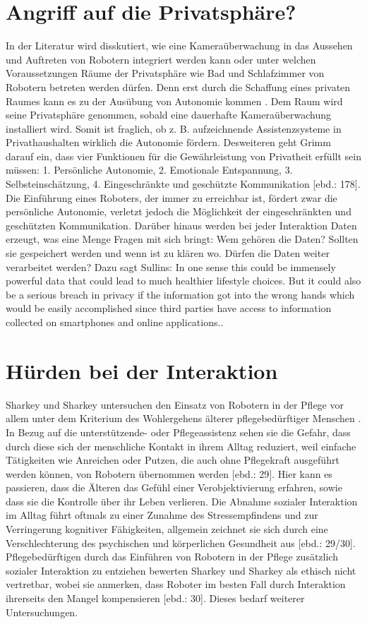 \section{Angriff auf die Privatsphäre?}
\label{sec:priv}
In der Literatur wird disskutiert, wie eine Kameraüberwachung in das Aussehen und Auftreten von Robotern integriert werden kann oder unter welchen Voraussetzungen Räume der Privatsphäre wie Bad und Schlafzimmer von Robotern betreten werden dürfen. Denn erst durch die Schaffung eines privaten Raumes kann es zu der Ausübung von Autonomie kommen \cite[178]{priv}. Dem Raum wird seine Privatsphäre genommen, sobald eine dauerhafte Kameraüberwachung installiert wird. Somit ist fraglich, ob z. B. aufzeichnende Assistenzsysteme in Privathaushalten wirklich die Autonomie fördern. Desweiteren geht Grimm darauf ein, dass vier Funktionen für die Gewährleistung von Privatheit erfüllt sein müssen: 1. Persönliche Autonomie, 2. Emotionale Entspannung, 3. Selbsteinschätzung, 4. Eingeschränkte und geschützte Kommunikation [ebd.: 178]. Die Einführung eines Roboters, der immer zu erreichbar ist, fördert zwar die persönliche Autonomie, verletzt jedoch die Möglichkeit der eingeschränkten und geschützten Kommunikation.
Darüber hinaus werden bei jeder Interaktion Daten erzeugt, was eine Menge Fragen mit sich bringt: Wem gehören die Daten? Sollten sie gespeichert werden und wenn ist zu klären wo. Dürfen die Daten weiter verarbeitet werden? Dazu sagt Sullins: \grqq In one sense this could be immensely powerful data that could lead to much healthier lifestyle choices. But it could also be a serious breach in privacy if the information got into the wrong hands which would be easily accomplished since third parties have access to information collected on smartphones and online applications.\grqq \cite{sullins}.
\section{Hürden bei der Interaktion}
\label{sec.interaction}
Sharkey und Sharkey untersuchen den Einsatz von Robotern in der Pflege vor allem unter dem Kriterium des Wohlergehens älterer pflegebedürftiger Menschen \cite[28]{sharky}. In Bezug auf die unterstützende- oder Pflegeassistenz sehen sie die Gefahr, dass durch diese sich der menschliche Kontakt in ihrem Alltag reduziert, weil einfache Tätigkeiten wie Anreichen oder Putzen, die auch ohne Pflegekraft ausgeführt werden können, von Robotern übernommen werden [ebd.: 29]. Hier kann es passieren, dass die Älteren das Gefühl einer Verobjektivierung erfahren, sowie dass sie die Kontrolle über ihr Leben verlieren. Die Abnahme sozialer Interaktion im Alltag führt oftmals zu einer Zunahme des Stressempfindens und zur Verringerung kognitiver Fähigkeiten, allgemein zeichnet sie sich durch eine Verschlechterung des psychischen und körperlichen Gesundheit aus [ebd.: 29/30]. Pflegebedürftigen durch das Einführen von Robotern in der Pflege zusätzlich sozialer Interaktion zu entziehen bewerten Sharkey und Sharkey als ethisch nicht vertretbar, wobei sie anmerken, dass Roboter im besten Fall durch Interaktion ihrerseits den Mangel kompensieren [ebd.: 30]. Dieses bedarf weiterer Untersuchungen.
